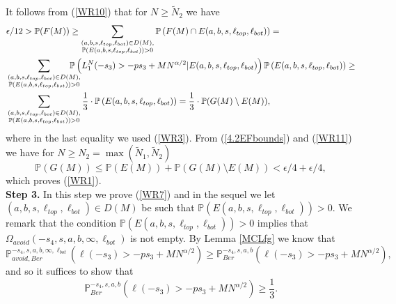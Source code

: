It follows from (\ref{WR10}) that for $N \geq \tilde{N}_2$ we have
\begin{equation}\label{WR11}
	\begin{split}
		& \epsilon/12 > \mathbb{P}(F(M)) \geq \sum_{\substack{(a,b,s,\ell_{top}, \ell_{bot})\in D(M), \\ \mathbb{P}(E(a,b,s, \ell_{top}, \ell_{bot})) > 0}} \mathbb{P}\left(F(M)\cap E(a,b,s, \ell_{top}, \ell_{bot})\right) = \\
		&\sum_{\substack{(a,b,s,\ell_{top}, \ell_{bot})\in D(M), \\ \mathbb{P}(E(a,b,s, \ell_{top}, \ell_{bot})) > 0}} \hspace{-5mm} \mathbb{P}\left( L_1^N(-s_3) > -ps_3 + MN^{\alpha/2} \vert  E(a,b,s,\ell_{top}, \ell_{bot}) \right )\mathbb{P}\left(E(a,b,s,\ell_{top}, \ell_{bot}) \right) \geq \\
		& \sum_{\substack{(a,b,s,\ell_{top}, \ell_{bot})\in D(M), \\ \mathbb{P}(E(a,b,s, \ell_{top}, \ell_{bot})) > 0}} \frac{1}{3} \cdot \mathbb{P}\left(E(a,b,s,\ell_{top}, \ell_{bot}) \right)  =  \frac{1}{3} \cdot \mathbb{P}(G(M)\setminus E(M)),
	\end{split}
\end{equation}
where in the last equality we used (\ref{WR3}). From (\ref{4.2EFbounds}) and (\ref{WR11}) we have for $N \geq N_2 = \max(\tilde{N}_1, \tilde{N}_2)$  
$$\mathbb{P}(G(M)) \leq \mathbb{P}(E(M)) + \mathbb{P}(G(M)\setminus E(M))< \epsilon/4 + \epsilon/4,$$
which proves (\ref{WR1}).\\


{\bf \raggedleft Step 3.} In this step we prove (\ref{WR7}) and in the sequel we let $(a,b,s,\ell_{top},\ell_{bot})\in D(M)$ be such that $\mathbb{P}( E(a,b,s,\ell_{top},\ell_{bot})) > 0$. We remark that the condition $\mathbb{P}( E(a,b,s,\ell_{top},\ell_{bot})) >0 $ implies that $\Omega_{avoid}({-s_4,s,a,b,\infty,\ell_{bot}})$ is not empty. By Lemma \ref{MCLfg} we know that 
$$\mathbb{P}^{-s_4,s,a,b,\infty,\ell_{bot}}_{avoid, Ber}\left(\ell(-s_3) > -ps_3 + MN^{\alpha/2}\right) \geq \mathbb{P}^{-s_4,s,a,b}_{ Ber}\left(\ell(-s_3) > -ps_3 + MN^{\alpha/2}\right),$$
and so it suffices to show that 
\begin{equation}\label{WT0}
	\mathbb{P}^{-s_4,s,a,b}_{Ber}\left(\ell(-s_3) > -ps_3 + MN^{\alpha/2}\right) \geq \frac{1}{3}.
\end{equation}

